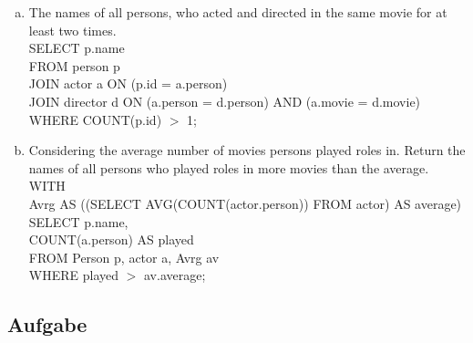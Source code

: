 \documentclass[11pt,a4paper,DIV=9]{scrartcl}
\newcounter{temp}
\newcommand{\aufgabe}[1]{
  \setcounter{temp}{\value{subsection}}
  \setcounter{subsection}{#1}
  \addtocounter{subsection}{-1}
  \subsection{Aufgabe}
  \setcounter{subsection}{\value{temp}}
}
\begin{document}
\begin{enumerate}[a.]
      \item The names of all persons, who acted and directed in the same movie for at least two times.\hfill\\
      SELECT p.name \\
      FROM person p \\
      JOIN actor a ON (p.id = a.person) \\
      JOIN director d ON (a.person = d.person) AND (a.movie = d.movie) \\
      WHERE COUNT(p.id) $>$ 1; 

      \item Considering the average number of movies persons played roles in. Return the names of all persons who played roles in more movies than the average.\hfill\\
      WITH \\
        Avrg AS ((SELECT AVG(COUNT(actor.person)) FROM actor) AS average) \\
      SELECT p.name, \\
	     COUNT(a.person) AS played \\
      FROM Person p, actor a, Avrg av \\
      WHERE  played $>$ av.average; 
      
    \end{enumerate}
\aufgabe{2}
\end{document}
